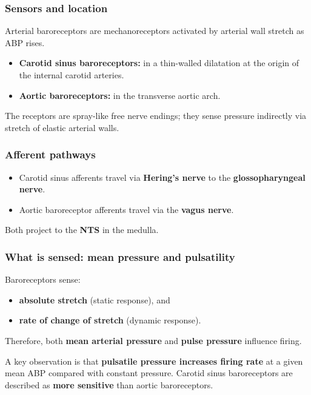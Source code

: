 \documentclass[11pt,a4paper]{article}
\begin{document}
\subsubsection{Sensors and location}
Arterial baroreceptors are mechanoreceptors activated by arterial wall stretch as ABP rises.
\begin{itemize}
\item \textbf{Carotid sinus baroreceptors:} in a thin-walled dilatation at the origin of the internal carotid arteries.
\item \textbf{Aortic baroreceptors:} in the transverse aortic arch.
\end{itemize}
The receptors are spray-like free nerve endings; they sense pressure indirectly via stretch of elastic arterial walls.

\subsubsection{Afferent pathways}
\begin{itemize}
\item Carotid sinus afferents travel via \textbf{Hering's nerve} to the \textbf{glossopharyngeal nerve}.
\item Aortic baroreceptor afferents travel via the \textbf{vagus nerve}.
\end{itemize}
Both project to the \textbf{NTS} in the medulla.

\subsubsection{What is sensed: mean pressure and pulsatility}
Baroreceptors sense:
\begin{itemize}
\item \textbf{absolute stretch} (static response), and
\item \textbf{rate of change of stretch} (dynamic response).
\end{itemize}
Therefore, both \textbf{mean arterial pressure} and \textbf{pulse pressure} influence firing.

A key observation is that \textbf{pulsatile pressure increases firing rate} at a given mean ABP compared with constant pressure. Carotid sinus baroreceptors are described as \textbf{more sensitive} than aortic baroreceptors.
\end{document}
